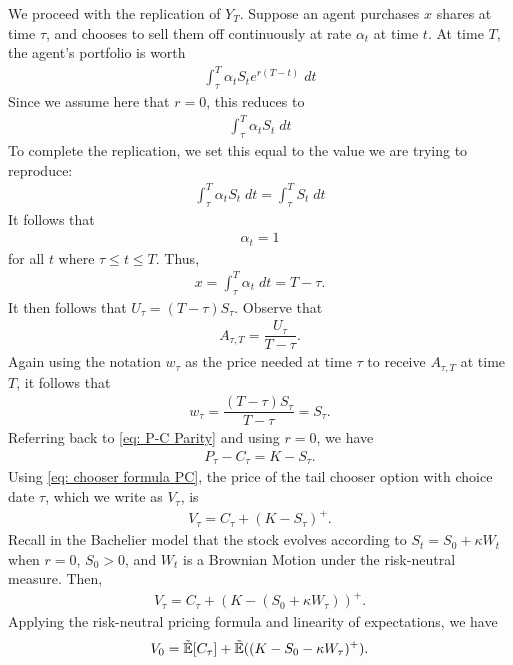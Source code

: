 \documentclass[reqno]{amsart}
\begin{document}
We proceed with the replication of $Y_T$. Suppose an agent purchases $x$ shares at time $\tau$, and chooses to sell them off continuously at rate $\alpha_t$ at time $t$.
At time $T$, the agent's portfolio is worth
\begin{align}
     \int_\tau^T \alpha_t S_t e^{r(T-t)} \;dt
\end{align}
Since we assume here that $r=0$, this reduces to
\begin{align}
     \int_\tau^T \alpha_t S_t \;dt
\end{align}
To complete the replication, we set this equal to the value we are trying to reproduce:
\begin{align}
     \int_\tau^T \alpha_t S_t \;dt = \int_\tau^T S_t \;dt
\end{align}
It follows that
\begin{align}
     \alpha_t = 1
\end{align}
for all $t$ where $\tau \leq t \leq T$. Thus,
\begin{align}
     x = \int_\tau^T \alpha_t \;dt = T - \tau.
\end{align}
It then follows that $U_\tau = (T - \tau) S_\tau$. Observe that 
\begin{align}
     A_{\tau, T} = \dfrac{U_\tau}{T - \tau}.
\end{align}
Again using the notation $w_\tau$ as the price needed at time $\tau$ to receive $A_{\tau, T}$ at time $T$, it follows that
\begin{align}
     w_\tau = \dfrac{(T - \tau) S_\tau}{T - \tau} = S_\tau.
\end{align}
Referring back to \eqref{eq: P-C Parity} and using $r = 0$, we have
\begin{align}
     P_\tau - C_\tau = K - S_\tau.
\end{align}
Using \eqref{eq: chooser formula PC}, the price of the tail chooser option with choice date $\tau$, which we write as $V_\tau$, is
\begin{align}
     V_\tau = C_\tau + (K - S_\tau)^+.
\end{align}
Recall in the Bachelier model that the stock evolves according to $S_t = S_0 + \kappa W_t$ when $r = 0$, $S_0 > 0$, and $W_t$ is a Brownian Motion under the risk-neutral measure. Then,
\begin{align}
     V_\tau = C_\tau + (K - (S_0 + \kappa W_\tau))^+.
\end{align}
Applying the risk-neutral pricing formula and linearity of expectations, we have
\begin{align} \label{eq: expect form}
     V_0 = \tilde{\mathbb{E}}[C_\tau] + \tilde{\mathbb{E}}((K - S_0 - \kappa W_\tau)^+).
\end{align}
\end{document}

